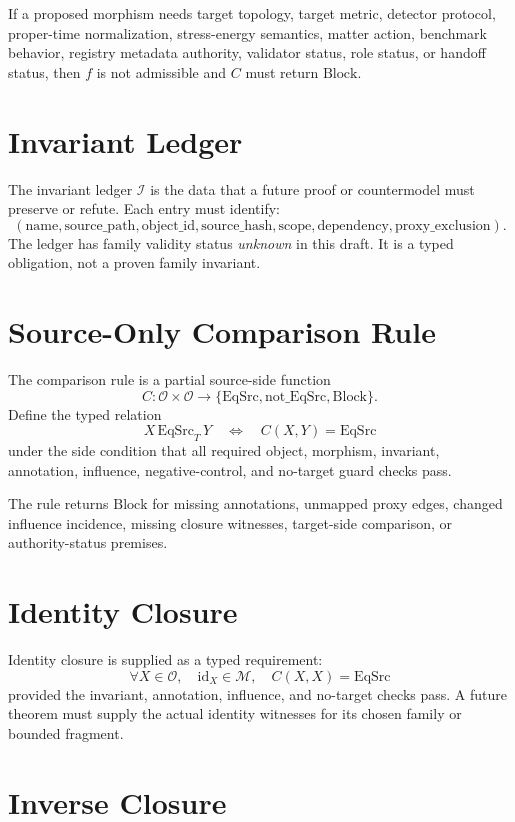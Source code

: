 \documentclass[11pt]{article}
\newcommand{\EqSrc}{\mathrm{EqSrc}}
\newcommand{\Block}{\mathrm{Block}}
\newcommand{\NotEqSrc}{\mathrm{not\_EqSrc}}
\begin{document}
If a proposed morphism needs target topology, target metric, detector protocol,
proper-time normalization, stress-energy semantics, matter action, benchmark
behavior, registry metadata authority, validator status, role status, or
handoff status, then \(f\) is not admissible and \(C\) must return \(\Block\).

\section{Invariant Ledger}

The invariant ledger \(\mathcal{I}\) is the data that a future proof or
countermodel must preserve or refute. Each entry must identify:
\[
  (\mathrm{name}, \mathrm{source\_path}, \mathrm{object\_id},
  \mathrm{source\_hash}, \mathrm{scope}, \mathrm{dependency},
  \mathrm{proxy\_exclusion}).
\]
The ledger has family validity status \emph{unknown} in this draft. It is a
typed obligation, not a proven family invariant.

\section{Source-Only Comparison Rule}

The comparison rule is a partial source-side function
\[
  C:\mathcal{O}\times\mathcal{O}\to
  \{\EqSrc,\NotEqSrc,\Block\}.
\]
Define the typed relation
\[
  X\,\EqSrc_T\,Y \quad \Longleftrightarrow \quad C(X,Y)=\EqSrc
\]
under the side condition that all required object, morphism, invariant,
annotation, influence, negative-control, and no-target guard checks pass.

The rule returns \(\Block\) for missing annotations, unmapped proxy edges,
changed influence incidence, missing closure witnesses, target-side comparison,
or authority-status premises.

\section{Identity Closure}

Identity closure is supplied as a typed requirement:
\[
  \forall X\in\mathcal{O},\quad \mathrm{id}_X\in\mathcal{M},
  \quad C(X,X)=\EqSrc
\]
provided the invariant, annotation, influence, and no-target checks pass. A
future theorem must supply the actual identity witnesses for its chosen family
or bounded fragment.

\section{Inverse Closure}
\end{document}
